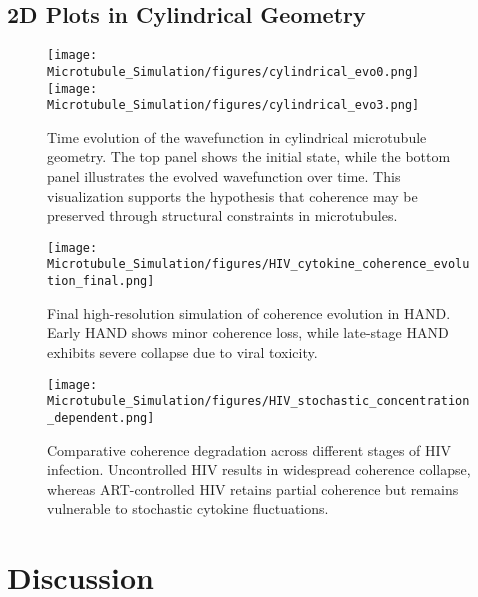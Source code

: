 \documentclass[entropy,article,submit,oneauthor,pdftex,]{Definitions/mdpi}
\begin{document}
\subsection{2D Plots in Cylindrical Geometry}
\begin{figure}[H]
    \centering
    \texttt{[image: Microtubule\_Simulation/figures/cylindrical\_evo0.png]}
    \texttt{[image: Microtubule\_Simulation/figures/cylindrical\_evo3.png]}
    \caption{Time evolution of the wavefunction in cylindrical microtubule geometry. The top panel shows the initial state, while the bottom panel illustrates the evolved wavefunction over time. This visualization supports the hypothesis that coherence may be preserved through structural constraints in microtubules.}
    \label{fig:cylindrical_geometry}
\end{figure}
\FloatBarrier  %
\begin{figure}[H]
    \centering
    \texttt{[image: Microtubule\_Simulation/figures/HIV\_cytokine\_coherence\_evolution\_final.png]}
    \caption{Final high-resolution simulation of coherence evolution in HAND. Early HAND shows minor coherence loss, while late-stage HAND exhibits severe collapse due to viral toxicity.} \label{fig:HIV_coherence_evolution_final}
\end{figure}
\begin{figure}[H]
    \centering
    \texttt{[image: Microtubule\_Simulation/figures/HIV\_stochastic\_concentration\_dependent.png]}
    \caption{Comparative coherence degradation across different stages of HIV infection. Uncontrolled HIV results in widespread coherence collapse, whereas ART-controlled HIV retains partial coherence but remains vulnerable to stochastic cytokine fluctuations.}
    \label{fig:HIV_coherence_stages}
\end{figure}
\FloatBarrier  %
\section{Discussion}
\end{document}
